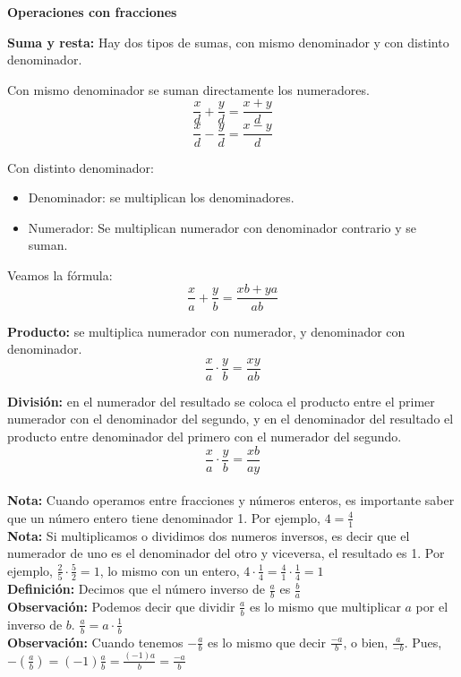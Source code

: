 \documentclass{article}
\begin{document}
\begin{normalsize}
\begin{center}
\textbf{Operaciones con fracciones}
\end{center}
\end{normalsize}

\begin{normalsize}
\textbf{Suma y resta:} Hay dos tipos de sumas, con mismo denominador y con distinto denominador.

Con mismo denominador se suman directamente los numeradores.
\[\frac{x}{d}+\frac{y}{d}=\frac{x+y}{d}\]
\[\frac{x}{d}-\frac{y}{d}=\frac{x-y}{d}\]

Con distinto denominador:
\begin{itemize}
	\item Denominador: se multiplican los denominadores.
	\item Numerador: Se multiplican numerador con denominador contrario y se suman.
\end{itemize}
Veamos la fórmula:
\[\frac{x}{a}+\frac{y}{b}=\frac{xb+ya}{ab}\]

\textbf{Producto:} se multiplica numerador con numerador, y denominador con denominador.
\[\frac{x}{a}\cdot\frac{y}{b}=\frac{xy}{ab}\]

\textbf{División:} en el numerador del resultado se coloca el producto entre el primer numerador con el denominador del segundo, y en el denominador del resultado el producto entre denominador del primero con el numerador del segundo.
\[\frac{x}{a}\cdot\frac{y}{b}=\frac{xb}{ay}\]\\

\textbf{Nota:} Cuando operamos entre fracciones y números enteros, es importante saber que un número entero tiene denominador 1. Por ejemplo, $4=\frac{4}{1}$\\

\textbf{Nota:} Si multiplicamos o dividimos dos numeros inversos, es decir que el numerador de uno es el denominador del otro y viceversa, el resultado es 1. Por ejemplo, $\frac{2}{5}\cdot\frac{5}{2}=1$, lo mismo con un entero, $4\cdot\frac{1}{4}=\frac{4}{1}\cdot\frac{1}{4}=1$\\

\textbf{Definición:} Decimos que el número inverso de $\frac{a}{b}$ es $\frac{b}{a}$\\

\textbf{Observación:} Podemos decir que dividir $\frac{a}{b}$ es lo mismo que multiplicar $a$ por el inverso de $b$. $\frac{a}{b}=a\cdot\frac{1}{b}$\\

\textbf{Observación:} Cuando tenemos $-\frac{a}{b}$ es lo mismo que decir $\frac{-a}{b}$, o bien, $\frac{a}{-b}$. Pues, $-(\frac{a}{b})=(-1)\frac{a}{b}=\frac{(-1)a}{b}=\frac{-a}{b}$\\
\end{normalsize}
\end{document}

